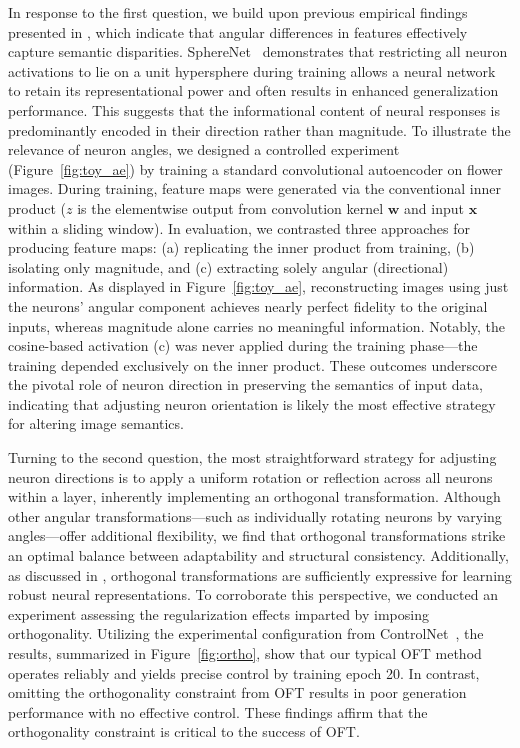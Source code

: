 In response to the first question, we build upon previous empirical findings presented in \cite{liu2018decoupled,chen2020angular}, which indicate that angular differences in features effectively capture semantic disparities. SphereNet~\cite{liu2017deep} demonstrates that restricting all neuron activations to lie on a unit hypersphere during training allows a neural network to retain its representational power and often results in enhanced generalization performance. This suggests that the informational content of neural responses is predominantly encoded in their direction rather than magnitude. To illustrate the relevance of neuron angles, we designed a controlled experiment (Figure~\ref{fig:toy_ae}) by training a standard convolutional autoencoder on flower images. During training, feature maps were generated via the conventional inner product ($z$ is the elementwise output from convolution kernel $\bm{w}$ and input $\bm{x}$ within a sliding window). In evaluation, we contrasted three approaches for producing feature maps: (a) replicating the inner product from training, (b) isolating only magnitude, and (c) extracting solely angular (directional) information. As displayed in Figure~\ref{fig:toy_ae}, reconstructing images using just the neurons' angular component achieves nearly perfect fidelity to the original inputs, whereas magnitude alone carries no meaningful information. Notably, the cosine-based activation (c) was never applied during the training phase—the training depended exclusively on the inner product. These outcomes underscore the pivotal role of neuron direction in preserving the semantics of input data, indicating that adjusting neuron orientation is likely the most effective strategy for altering image semantics.

Turning to the second question, the most straightforward strategy for adjusting neuron directions is to apply a uniform rotation or reflection across all neurons within a layer, inherently implementing an orthogonal transformation. Although other angular transformations—such as individually rotating neurons by varying angles—offer additional flexibility, we find that orthogonal transformations strike an optimal balance between adaptability and structural consistency. Additionally, as discussed in \cite{liu2021orthogonal}, orthogonal transformations are sufficiently expressive for learning robust neural representations. To corroborate this perspective, we conducted an experiment assessing the regularization effects imparted by imposing orthogonality. Utilizing the experimental configuration from ControlNet~\cite{zhang2023adding}, the results, summarized in Figure~\ref{fig:ortho}, show that our typical OFT method operates reliably and yields precise control by training epoch 20. In contrast, omitting the orthogonality constraint from OFT results in poor generation performance with no effective control. These findings affirm that the orthogonality constraint is critical to the success of OFT.

